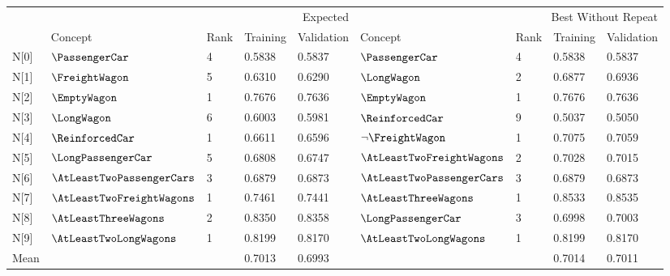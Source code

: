 \begin{tabular}{lllllllll}
\toprule
 & \multicolumn{4}{r}{Expected} & \multicolumn{4}{r}{Best Without Repeat} \\
 & Concept & Rank & Training & Validation & Concept & Rank & Training & Validation \\
\midrule
N[0] & $\PassengerCar$ & 4 & 0.5838 & 0.5837 & $\PassengerCar$ & 4 & 0.5838 & 0.5837 \\
N[1] & $\FreightWagon$ & 5 & 0.6310 & 0.6290 & $\LongWagon$ & 2 & 0.6877 & 0.6936 \\
N[2] & $\EmptyWagon$ & 1 & 0.7676 & 0.7636 & $\EmptyWagon$ & 1 & 0.7676 & 0.7636 \\
N[3] & $\LongWagon$ & 6 & 0.6003 & 0.5981 & $\ReinforcedCar$ & 9 & 0.5037 & 0.5050 \\
N[4] & $\ReinforcedCar$ & 1 & 0.6611 & 0.6596 & $\neg \FreightWagon$ & 1 & 0.7075 & 0.7059 \\
N[5] & $\LongPassengerCar$ & 5 & 0.6808 & 0.6747 & $\AtLeastTwoFreightWagons$ & 2 & 0.7028 & 0.7015 \\
N[6] & $\AtLeastTwoPassengerCars$ & 3 & 0.6879 & 0.6873 & $\AtLeastTwoPassengerCars$ & 3 & 0.6879 & 0.6873 \\
N[7] & $\AtLeastTwoFreightWagons$ & 1 & 0.7461 & 0.7441 & $\AtLeastThreeWagons$ & 1 & 0.8533 & 0.8535 \\
N[8] & $\AtLeastThreeWagons$ & 2 & 0.8350 & 0.8358 & $\LongPassengerCar$ & 3 & 0.6998 & 0.7003 \\
N[9] & $\AtLeastTwoLongWagons$ & 1 & 0.8199 & 0.8170 & $\AtLeastTwoLongWagons$ & 1 & 0.8199 & 0.8170 \\
Mean &  &  & 0.7013 & 0.6993 &  &  & 0.7014 & 0.7011 \\
\bottomrule
\end{tabular}
